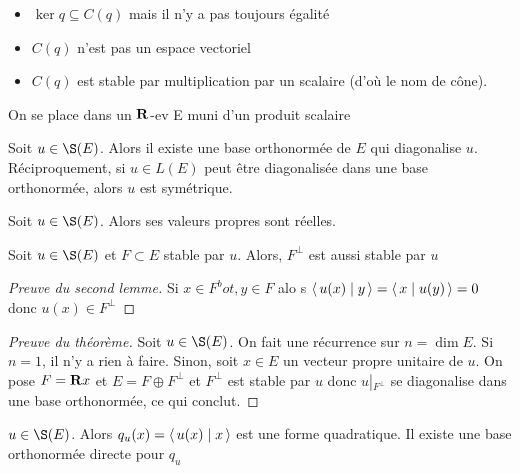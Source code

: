 \begin{rem}
\begin{itemize}
    \item $\ker q\subseteq C(q)$ mais il n'y a pas toujours égalité
    \item  $C(q)$ n'est pas un espace vectoriel
    \item  $C(q)$ est stable par multiplication par un scalaire (d'où le nom de cône).
\end{itemize}
\end{rem}



On se place dans un $ \mathbf R$-ev E muni d'un produit scalaire

\begin{thm}
    Soit $u \in  \S(E)$. Alors il existe une base orthonormée de $E$ qui diagonalise  $u$. Réciproquement, si  $u \in  L(E)$ peut être diagonalisée dans une base orthonormée, alors  $u$ est symétrique.
\end{thm}

\begin{lmm}
    Soit $u \in  \S(E)$. Alors ses valeurs propres sont réelles.
\end{lmm}

\begin{lmm}
    Soit $u \in  \S(E)$ et $F\subset E$ stable par  $u$. Alors,  $F^\bot$ est aussi stable par  $u$
\end{lmm}

\begin{proof}[Preuve du second lemme]
    Si $x \in  F^bot, y \in  F$ alo s $ \scalar{u(x)}{y}= \scalar{x}{u(y)}=0  $ donc $u(x)\in F^\bot$
\end{proof}

\begin{proof}[Preuve du théorème]
    Soit $u \in  \S(E)$. On fait une récurrence sur $n=\dim E$. Si  $n=1$, il n'y a rien à faire. Sinon, soit  $x\in  E$ un vecteur propre unitaire de $u$. On pose $F=\mathbf R x$ et $E=F\oplus F^\bot$ et  $F^\bot$ est stable par  $u$ donc  $u\left|_{F^\bot}\right.$ se diagonalise dans une base orthonormée, ce qui conclut.
\end{proof}


\begin{cor}
    $u \in  \S(E)$. Alors $q_u(x)= \scalar{u(x)}{x} $ est une forme quadratique. Il existe une base orthonormée directe pour $q_u$
\end{cor}

